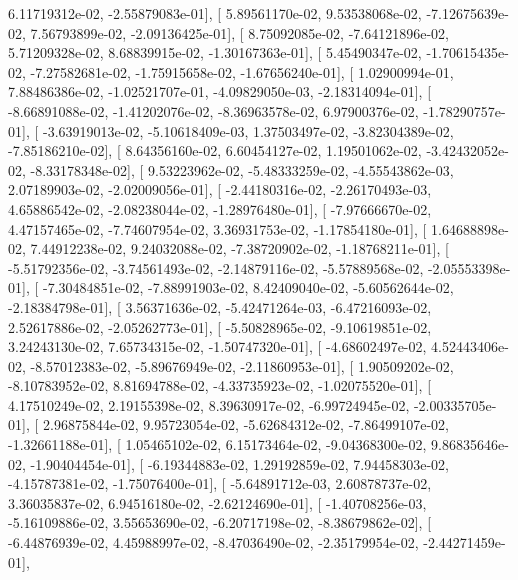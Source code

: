 \documentclass{article}
\begin{document}
          6.11719312e-02,  -2.55879083e-01],
       [  5.89561170e-02,   9.53538068e-02,  -7.12675639e-02,
          7.56793899e-02,  -2.09136425e-01],
       [  8.75092085e-02,  -7.64121896e-02,   5.71209328e-02,
          8.68839915e-02,  -1.30167363e-01],
       [  5.45490347e-02,  -1.70615435e-02,  -7.27582681e-02,
         -1.75915658e-02,  -1.67656240e-01],
       [  1.02900994e-01,   7.88486386e-02,  -1.02521707e-01,
         -4.09829050e-03,  -2.18314094e-01],
       [ -8.66891088e-02,  -1.41202076e-02,  -8.36963578e-02,
          6.97900376e-02,  -1.78290757e-01],
       [ -3.63919013e-02,  -5.10618409e-03,   1.37503497e-02,
         -3.82304389e-02,  -7.85186210e-02],
       [  8.64356160e-02,   6.60454127e-02,   1.19501062e-02,
         -3.42432052e-02,  -8.33178348e-02],
       [  9.53223962e-02,  -5.48333259e-02,  -4.55543862e-03,
          2.07189903e-02,  -2.02009056e-01],
       [ -2.44180316e-02,  -2.26170493e-03,   4.65886542e-02,
         -2.08238044e-02,  -1.28976480e-01],
       [ -7.97666670e-02,   4.47157465e-02,  -7.74607954e-02,
          3.36931753e-02,  -1.17854180e-01],
       [  1.64688898e-02,   7.44912238e-02,   9.24032088e-02,
         -7.38720902e-02,  -1.18768211e-01],
       [ -5.51792356e-02,  -3.74561493e-02,  -2.14879116e-02,
         -5.57889568e-02,  -2.05553398e-01],
       [ -7.30484851e-02,  -7.88991903e-02,   8.42409040e-02,
         -5.60562644e-02,  -2.18384798e-01],
       [  3.56371636e-02,  -5.42471264e-03,  -6.47216093e-02,
          2.52617886e-02,  -2.05262773e-01],
       [ -5.50828965e-02,  -9.10619851e-02,   3.24243130e-02,
          7.65734315e-02,  -1.50747320e-01],
       [ -4.68602497e-02,   4.52443406e-02,  -8.57012383e-02,
         -5.89676949e-02,  -2.11860953e-01],
       [  1.90509202e-02,  -8.10783952e-02,   8.81694788e-02,
         -4.33735923e-02,  -1.02075520e-01],
       [  4.17510249e-02,   2.19155398e-02,   8.39630917e-02,
         -6.99724945e-02,  -2.00335705e-01],
       [  2.96875844e-02,   9.95723054e-02,  -5.62684312e-02,
         -7.86499107e-02,  -1.32661188e-01],
       [  1.05465102e-02,   6.15173464e-02,  -9.04368300e-02,
          9.86835646e-02,  -1.90404454e-01],
       [ -6.19344883e-02,   1.29192859e-02,   7.94458303e-02,
         -4.15787381e-02,  -1.75076400e-01],
       [ -5.64891712e-03,   2.60878737e-02,   3.36035837e-02,
          6.94516180e-02,  -2.62124690e-01],
       [ -1.40708256e-03,  -5.16109886e-02,   3.55653690e-02,
         -6.20717198e-02,  -8.38679862e-02],
       [ -6.44876939e-02,   4.45988997e-02,  -8.47036490e-02,
         -2.35179954e-02,  -2.44271459e-01],
\end{document}
